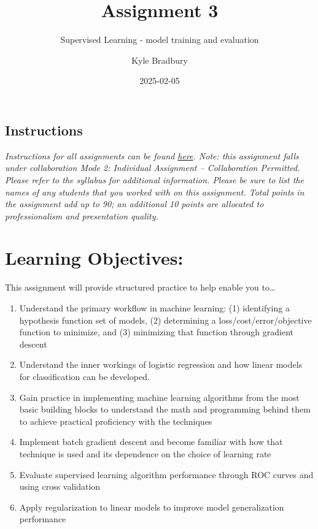 \documentclass[
  letterpaper,
  DIV=11,
  numbers=noendperiod]{scrartcl}
\title{Assignment 3}
\subtitle{Supervised Learning - model training and evaluation}
\author{Kyle Bradbury}
\date{2025-02-05}
\providecommand{\tightlist}{%
  \setlength{\itemsep}{0pt}\setlength{\parskip}{0pt}}\usepackage{longtable,booktabs,array}
\renewcommand*\contentsname{Table of contents}
\newcommand\contentsname{Table of contents}
\begin{document}
\maketitle

\renewcommand*\contentsname{Table of contents}
{
\hypersetup{linkcolor=}
\setcounter{tocdepth}{1}
\tableofcontents
}

\subsection{Instructions}\label{instructions}

\emph{Instructions for all assignments can be found
\href{https://kylebradbury.github.io/ids705/notebooks/assignment_instructions.html}{here}.
Note: this assignment falls under collaboration Mode 2: Individual
Assignment -- Collaboration Permitted. Please refer to the syllabus for
additional information. Please be sure to list the names of any students
that you worked with on this assignment. Total points in the assignment
add up to 90; an additional 10 points are allocated to professionalism
and presentation quality.}

\section{Learning Objectives:}\label{learning-objectives}

This assignment will provide structured practice to help enable you
to\ldots{}

\begin{enumerate}
\def\labelenumi{\arabic{enumi}.}
\tightlist
\item
  Understand the primary workflow in machine learning: (1) identifying a
  hypothesis function set of models, (2) determining a
  loss/cost/error/objective function to minimize, and (3) minimizing
  that function through gradient descent
\item
  Understand the inner workings of logistic regression and how linear
  models for classification can be developed.
\item
  Gain practice in implementing machine learning algorithms from the
  most basic building blocks to understand the math and programming
  behind them to achieve practical proficiency with the techniques
\item
  Implement batch gradient descent and become familiar with how that
  technique is used and its dependence on the choice of learning rate
\item
  Evaluate supervised learning algorithm performance through ROC curves
  and using cross validation
\item
  Apply regularization to linear models to improve model generalization
  performance
\end{enumerate}
\end{document}
